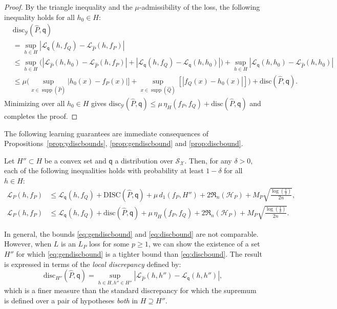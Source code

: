 \documentclass[twoside,11pt]{article}
\DeclareMathOperator{\supp}{supp}
\newcommand{\h}{\widehat}
\newcommand{\cH}{{\mathcal H}}
\newcommand{\cL}{{\mathcal L}}
\newcommand{\cS}{{\mathcal S}}
\newcommand{\cX}{{\mathcal X}}
\newcommand{\cY}{{\mathcal Y}}
\newcommand{\1}{\mat{1}}
\newcommand{\qq}{{\mathsf q}}
\newcommand{\dis}{\mathrm{disc}}
\newcommand{\DIS}{\mathrm{DISC}}
\newcommand{\Rad}{\mathfrak{R}}
\newcommand{\done}{d_1}
\begin{document}
\begin{proof}
  By the triangle inequality and the $\mu$-admissibility of the loss,
  the following inequality holds for all $h_0 \in H$:
\begin{align*}
& \dis_{\cY}(\h P, \qq) \\
& = \sup_{h \in H} | \cL_{\qq} (h, f_Q) -  \cL_{\h P }(h, f_P) | \\
& \leq  \sup_{h \in H} \Big( |\cL_{\h P} (h, h_0) - \cL_{\h P} (h,
f_P)| + |\cL_{\qq} (h, f_Q)  - \cL_{\qq} (h, h_0)| \Big)
+  \sup_{h \in H} | \cL_{\qq} (h, h_0) - \cL_{\h P}(h, h_0)|\\
& \leq \mu \Big(\sup_{x \in \supp(\h P)}  | h_0(x)  - f_P(x) |] +
 \sup_{x \in \supp(\h Q)} [| f_Q(x) - h_0(x) |] \Big)  +  \dis(\h P, \qq) .
\end{align*}
Minimizing over all $h_0 \in H$ gives
$\dis_{\cY}(\h P, \qq) \leq \mu \, \eta_H(f_P, f_Q) + \dis(\h P, \qq)$
and completes the proof.
\end{proof}

The following learning guarantees are immediate consequences of
Propositions~\ref{prop:ydiscbounds}, \ref{prop:gendiscbound}  and
\ref{prop:discbound}.

\begin{corollary}
Let $H'' \subset H$ be a convex set and $\qq$ a distribution over
$\cS_\cX$. Then, for any $\delta > 0$, each of the following
inequalities holds with probability at least $1 - \delta$ for all
$h  \in H$:
\begin{align}
\label{eq:gendiscbound}
 \cL_P(h, f_P)
& \leq \cL_{\qq}(h, f_Q) +  \DIS(\h P, \qq) + \mu \,
 \done(f_P, H'')+ 2 \Rad_n(\cH_P) + M_P
 \sqrt{\frac{\log(\frac{1}{\delta})}{2 n}},  \\
\label{eq:discbound}
 \cL_P(h, f_P)
& \leq \cL_{\qq}(h, f_Q) +  \dis(\h P, \qq) + \mu \, \eta_H(f_P, f_Q)
+ 2 \Rad_n(\cH_P) + M_P \sqrt{\frac{\log(\frac{1}{\delta})}{2 n}}.
\end{align}
\end{corollary}

In general, the bounds \eqref{eq:gendiscbound} and
\eqref{eq:discbound} are not comparable. However, when $L$ is an $L_P$
loss for some $p \geq 1$, we can show the existence of a set $H''$ for
which \eqref{eq:gendiscbound} is a tighter bound than
\eqref{eq:discbound}. The result is expressed in terms of the
\emph{local discrepancy} defined by:
\begin{equation*}
\label{eq:localdiscrepancy}
\dis_{H''}(\h P, \qq) = \sup_{h \in H,
h''\in H''} |\cL_{\h P}(h, h'') - \cL_{\qq}(h, h'')|,
\end{equation*}
which is a finer measure than the standard discrepancy for which the
supremum is defined over a pair of hypotheses \emph{both} in
$H \supseteq H''$.
\end{document}
